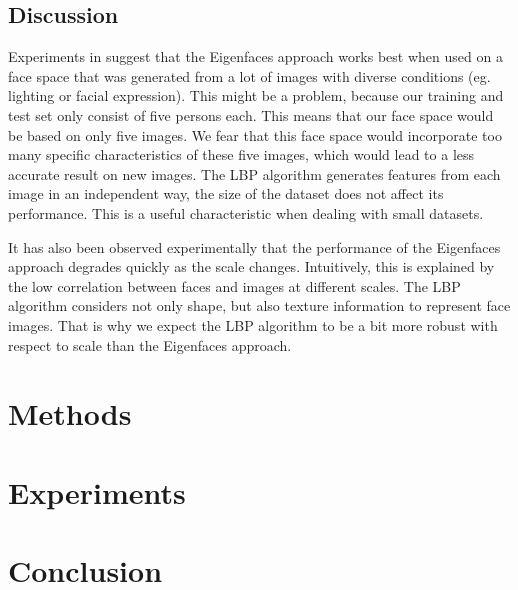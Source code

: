 \documentclass[]{article}
\begin{document}
\subsection{Discussion}
Experiments in \cite{chang2005evaluation} suggest that the Eigenfaces approach works best when used on a face space that was generated from a lot of images with diverse conditions (eg. lighting or facial expression). This might be a problem, because our training and test set only consist of five persons each. This means that our face space would be based on only five images. We fear that this face space would incorporate too many specific characteristics of these five images, which would lead to a less accurate result on new images. The LBP algorithm generates features from each image in an independent way, the size of the dataset does not affect its performance. This is a useful characteristic when dealing with small datasets.

It has also been observed experimentally that the performance of the Eigenfaces approach degrades quickly as the scale changes. Intuitively, this is explained by the low correlation between faces and images at different scales. The LBP algorithm considers not only shape, but also texture information to represent face images. That is why we expect the LBP algorithm to be a bit more robust with respect to scale than the Eigenfaces approach.

\section{Methods}



\section{Experiments}


\section{Conclusion}


\end{document}
